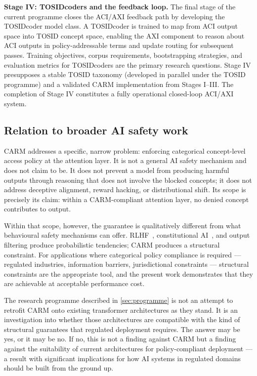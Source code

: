 \documentclass[11pt,a4paper]{article}
\theoremstyle{definition}
\begin{document}
\textbf{Stage IV: TOSIDcoders and the feedback loop.} The final stage of the
current programme closes the ACI/AXI feedback path by developing the
TOSIDcoder model class. A TOSIDcoder is trained to map from ACI output space
into TOSID concept space, enabling the AXI component to reason about ACI
outputs in policy-addressable terms and update routing for subsequent passes.
Training objectives, corpus requirements, bootstrapping strategies, and
evaluation metrics for TOSIDcoders are the primary research questions.
Stage IV presupposes a stable TOSID taxonomy (developed in parallel under the
TOSID programme) and a validated CARM implementation from Stages I--III.
The completion of Stage IV constitutes a fully operational closed-loop
ACI/AXI system.

\subsection{Relation to broader AI safety work}

CARM addresses a specific, narrow problem: enforcing categorical concept-level
access policy at the attention layer. It is not a general AI safety mechanism
and does not claim to be. It does not prevent a model from producing harmful
outputs through reasoning that does not involve the blocked concepts; it does
not address deceptive alignment, reward hacking, or distributional shift. Its
scope is precisely its claim: within a CARM-compliant attention layer, no
denied concept contributes to output.

Within that scope, however, the guarantee is qualitatively different from
what behavioural safety mechanisms can offer. RLHF~\cite{Christiano2017},
constitutional AI~\cite{Bai2022}, and output filtering produce probabilistic
tendencies; CARM produces a structural constraint. For applications where
categorical policy compliance is required --- regulated industries, information
barriers, jurisdictional constraints --- structural constraints are the
appropriate tool, and the present work demonstrates that they are achievable
at acceptable performance cost.

The research programme described in \cref{sec:programme} is not an attempt
to retrofit CARM onto existing transformer architectures as they stand. It is
an investigation into whether those architectures are compatible with the
kind of structural guarantees that regulated deployment requires. The answer
may be yes, or it may be no. If no, this is not a finding against CARM but a
finding against the suitability of current architectures for policy-compliant
deployment --- a result with significant implications for how AI systems in
regulated domains should be built from the ground up.
\end{document}
